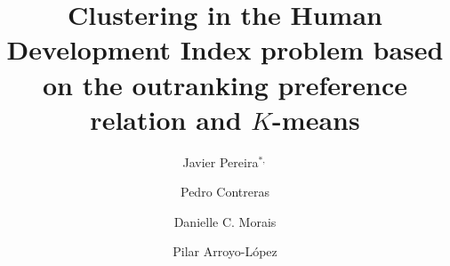 \documentclass[]{elsarticle}
\theoremstyle{definition}
\begin{document}
\begin{frontmatter}                           %


\title{Clustering in the Human Development Index problem based on the outranking preference relation and $K$-means}



%

\author[utc]{Javier Pereira$^{*,}$\cortext[cor1]}
\author[ap]{Pedro Contreras}
\author[ufpe]{Danielle C. Morais}
\author[itesm]{Pilar Arroyo-L\'opez}




\address[utc]{Universidad Tecnol\'ogica de Chile Inacap, Santiago, Chile (xjavierpereira7@gmail.com); \\}
\address[ap]{Berlin, Germany (pedro.contreras@gmail.com);}
\address[ufpe]{Universidade Federal de Pernambuco, CDSID (dcmorais@cdsid.org.br);}
\address[itesm]{Tecnologico de Monterrey, Campus Toluca, M\'exico (pilar.arroyo@itesm.mx);}




\end{frontmatter}
\end{document}
